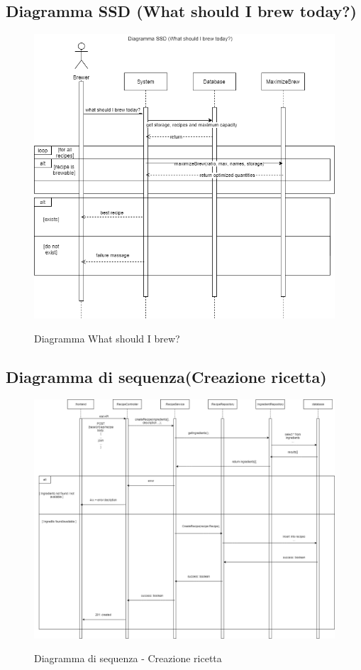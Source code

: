 \documentclass{article}
\begin{document}
\subsection{Diagramma SSD (What should I brew today?)}
\begin{figure}[h!]
\centering
\includegraphics[scale=0.5]{Diagramma SSD (1).png}
\label{fig:Diagramma What should I brew?}
\caption{Diagramma What should I brew?}
\end{figure}
\clearpage
\subsection{Diagramma di sequenza(Creazione ricetta)}
\begin{figure}[h!]
\centering
\includegraphics[scale=0.35]{Diagramma di Sequenza.png}
\label{fig:Diagramma di sequenza - Creazione ricetta}
\caption{Diagramma di sequenza - Creazione ricetta}
\end{figure}
\clearpage
\end{document}
